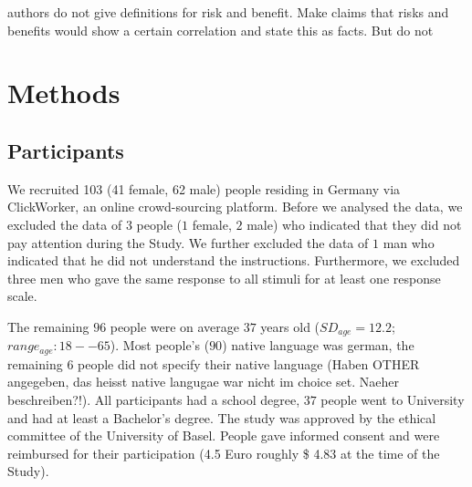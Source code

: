 \documentclass[a4paper,doc, natbib]{apa6} %
\begin{document}


authors do not give definitions for risk and benefit. Make claims that risks and benefits would show a certain correlation and state this as facts. But do not
\section{Methods}
\subsection{Participants}
We recruited 103 (41 female, 62 male) people residing in Germany via ClickWorker, an online crowd-sourcing platform. 
Before we analysed the data, we excluded the data of $3$ people ($1$ female, $2$ male) who indicated that they did not pay attention during the Study. We further excluded the data of $1$ man who indicated that he did not understand the instructions. Furthermore, we excluded three men who gave the same response to all stimuli for at least one response scale. %


The remaining $96$ people were on average $37$ years old ($SD_{age} = 12.2$; $range_{age}: 18 -- 65$). Most people's ($90$) native language was german, the remaining $6$ people did not specify their native language (Haben OTHER angegeben, das heisst native langugae war nicht im choice set. Naeher beschreiben?!). All participants had a school degree, $37$ people went to University and had at least a Bachelor's degree. 
The study was approved by the ethical committee of the University of Basel. People gave informed consent and were reimbursed for their participation (4.5 Euro roughly \$ 4.83 at the time of the Study).
\end{document}
